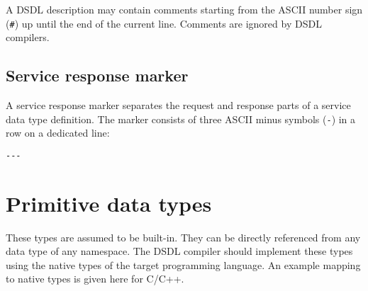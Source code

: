 A DSDL description may contain comments starting from the ASCII number sign (\verb|#|)
up until the end of the current line.
Comments are ignored by DSDL compilers.

\subsection{Service response marker}\label{sec:dsdl_service_response_marker}

A service response marker separates the request and response parts of a service data type definition.
The marker consists of three ASCII minus symbols (\verb|-|) in a row on a dedicated line:

\begin{verbatim}
---
\end{verbatim}

\section{Primitive data types}\label{sec:dsdl_primitive_data_types}

These types are assumed to be built-in.
They can be directly referenced from any data type of any namespace.
The DSDL compiler should implement these types using the native types of the target programming language.
An example mapping to native types is given here for C/C++.

